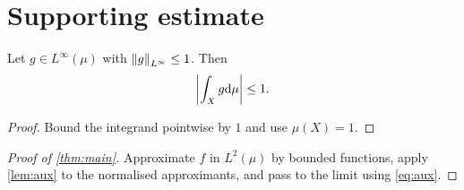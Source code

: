 
\section{Supporting estimate}
\label{sec:geometry}

\begin{lemma}
\label{lem:aux}
Let $g \in L^\infty(\mu)$ with $\left\lVert g \right\rVert_{L^\infty} \le 1$. Then
\begin{equation}
\label{eq:aux}
  \left\lvert \int_X g \mathrm{d}\mu \right\rvert \le 1 .
\end{equation}
\end{lemma}

\begin{proof}
Bound the integrand pointwise by $1$ and use $\mu(X) = 1$.
\end{proof}

\begin{proof}[Proof of \cref{thm:main}]
Approximate $f$ in $L^2(\mu)$ by bounded functions, apply
\cref{lem:aux} to the normalised approximants, and pass to the limit
using \cref{eq:aux}.
\end{proof}

